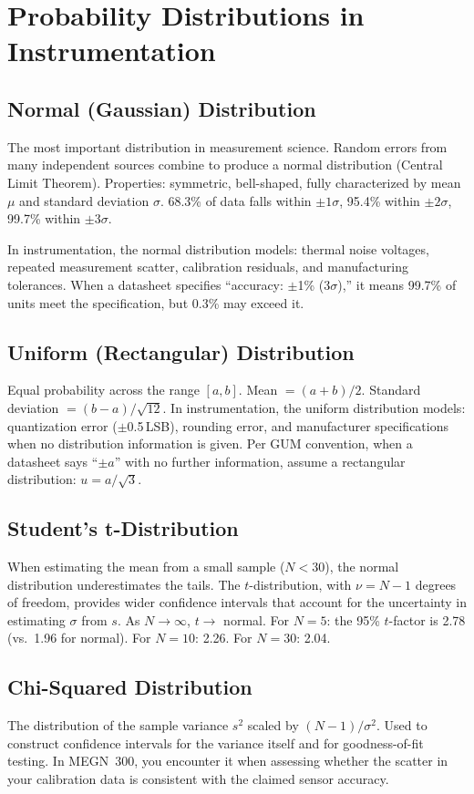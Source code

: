 \documentclass[11pt,letterpaper,twoside,openany]{book}
\begin{document}
\section{Probability Distributions in Instrumentation}
\subsection{Normal (Gaussian) Distribution}
The most important distribution in measurement science. Random errors from many independent sources combine to produce a normal distribution (Central Limit Theorem). Properties: symmetric, bell-shaped, fully characterized by mean $\mu$ and standard deviation $\sigma$. 68.3\% of data falls within $\pm 1\sigma$, 95.4\% within $\pm 2\sigma$, 99.7\% within $\pm 3\sigma$.

In instrumentation, the normal distribution models: thermal noise voltages, repeated measurement scatter, calibration residuals, and manufacturing tolerances. When a datasheet specifies ``accuracy: $\pm$1\% (3$\sigma$),'' it means 99.7\% of units meet the specification, but 0.3\% may exceed it.

\subsection{Uniform (Rectangular) Distribution}
Equal probability across the range $[a, b]$. Mean $= (a+b)/2$. Standard deviation $= (b-a)/\sqrt{12}$. In instrumentation, the uniform distribution models: quantization error ($\pm$0.5\,LSB), rounding error, and manufacturer specifications when no distribution information is given. Per GUM convention, when a datasheet says ``$\pm a$'' with no further information, assume a rectangular distribution: $u = a/\sqrt{3}$.

\subsection{Student's t-Distribution}
When estimating the mean from a small sample ($N < 30$), the normal distribution underestimates the tails. The $t$-distribution, with $\nu = N-1$ degrees of freedom, provides wider confidence intervals that account for the uncertainty in estimating $\sigma$ from $s$. As $N \to \infty$, $t \to$ normal. For $N = 5$: the 95\% $t$-factor is 2.78 (vs.\ 1.96 for normal). For $N = 10$: 2.26. For $N = 30$: 2.04.

\subsection{Chi-Squared Distribution}
The distribution of the sample variance $s^2$ scaled by $(N-1)/\sigma^2$. Used to construct confidence intervals for the variance itself and for goodness-of-fit testing. In MEGN~300, you encounter it when assessing whether the scatter in your calibration data is consistent with the claimed sensor accuracy.
\end{document}
